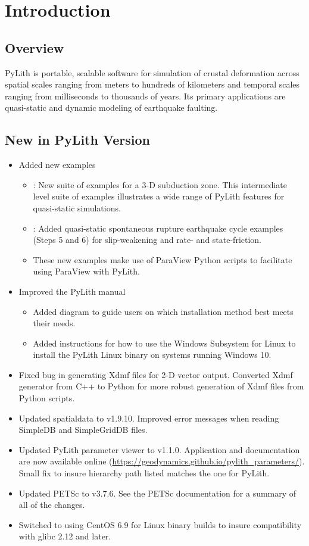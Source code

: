 
\chapter{Introduction}


\section{Overview}

PyLith is portable, scalable software for simulation of crustal
deformation across spatial scales ranging from meters to hundreds of
kilometers and temporal scales ranging from milliseconds to thousands
of years. Its primary applications are quasi-static and dynamic
modeling of earthquake faulting.

\section{New in PyLith Version \pylithVersionNumber}
\begin{itemize}
\item Added new examples
  \begin{itemize}
  \item {}: New suite of examples for a 3-D
    subduction zone. This intermediate level suite of examples
    illustrates a wide range of PyLith features for quasi-static simulations.
  \item {}: Added quasi-static
    spontaneous rupture earthquake cycle examples (Steps 5 and 6) for
    slip-weakening and rate- and state-friction.
  \item These new examples make use of ParaView Python scripts to
    facilitate using ParaView with PyLith.
  \end{itemize}
\item Improved the PyLith manual
  \begin{itemize}
  \item Added diagram to guide users on which installation method best
    meets their needs.
  \item Added instructions for how to use the Windows Subsystem for
    Linux to install the PyLith Linux binary on systems running
    Windows 10.
  \end{itemize}
\item Fixed bug in generating Xdmf files for 2-D vector
  output. Converted Xdmf generator from C++ to Python for more robust
  generation of Xdmf files from Python scripts.
\item Updated spatialdata to v1.9.10. Improved error messages when
  reading SimpleDB and SimpleGridDB files.
\item Updated PyLith parameter viewer to v1.1.0. Application and
  documentation are now available online
  (\url{https://geodynamics.github.io/pylith_parameters/}). Small fix
  to insure hierarchy path listed matches the one for PyLith.
\item Updated PETSc to v3.7.6. See the PETSc documentation for a
  summary of all of the changes.
\item Switched to using CentOS 6.9 for Linux binary builds to insure
  compatibility with glibc 2.12 and later.
\end{itemize}
